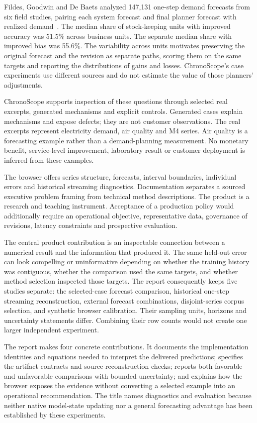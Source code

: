\documentclass[11pt,a4paper]{article}
\begin{document}
Fildes, Goodwin and De Baets analyzed 147,131 one-step demand forecasts from six field studies, pairing each system forecast and final planner forecast with realized demand~\cite{fva2025}. The median share of stock-keeping units with improved accuracy was 51.5\% across business units. The separate median share with improved bias was 55.6\%. The variability across units motivates preserving the original forecast and the revision as separate paths, scoring them on the same targets and reporting the distributions of gains and losses. ChronoScope's case experiments use different sources and do not estimate the value of those planners' adjustments.

ChronoScope supports inspection of these questions through selected real excerpts, generated mechanisms and explicit controls. Generated cases explain mechanisms and expose defects; they are not customer observations. The real excerpts represent electricity demand, air quality and M4 series. Air quality is a forecasting example rather than a demand-planning measurement. No monetary benefit, service-level improvement, laboratory result or customer deployment is inferred from these examples.

The browser offers series structure, forecasts, interval boundaries, individual errors and historical streaming diagnostics. Documentation separates a sourced executive problem framing from technical method descriptions. The product is a research and teaching instrument. Acceptance of a production policy would additionally require an operational objective, representative data, governance of revisions, latency constraints and prospective evaluation.

The central product contribution is an inspectable connection between a numerical result and the information that produced it. The same held-out error can look compelling or uninformative depending on whether the training history was contiguous, whether the comparison used the same targets, and whether method selection inspected those targets. The report consequently keeps five studies separate: the selected-case forecast comparison, historical one-step streaming reconstruction, external forecast combinations, disjoint-series corpus selection, and synthetic browser calibration. Their sampling units, horizons and uncertainty statements differ. Combining their row counts would not create one larger independent experiment.

The report makes four concrete contributions. It documents the implementation identities and equations needed to interpret the delivered predictions; specifies the artifact contracts and source-reconstruction checks; reports both favorable and unfavorable comparisons with bounded uncertainty; and explains how the browser exposes the evidence without converting a selected example into an operational recommendation. The title names diagnostics and evaluation because neither native model-state updating nor a general forecasting advantage has been established by these experiments.
\end{document}

